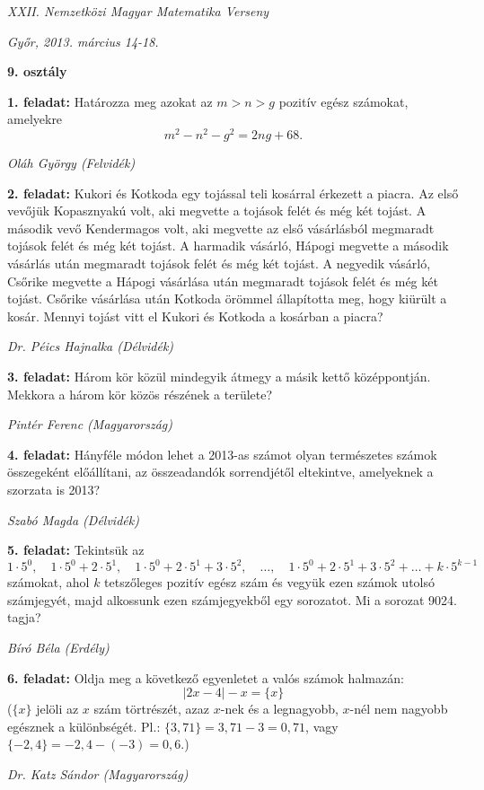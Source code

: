 \documentclass[a4paper,10pt]{article}
\newcommand{\ki}[2]{\hfill {\it #1 (#2)}\medskip}
\begin{document}
\begin{center} \Large {\em XXII. Nemzetközi Magyar Matematika Verseny} \end{center}
\begin{center} \large{\em Győr, 2013. március 14-18.} \end{center}
\smallskip
\begin{center} \large{\bf 9. osztály} \end{center}
\bigskip 

{\bf 1. feladat: } Határozza meg azokat az $m > n > g$ pozitív egész számokat, amelyekre
$$m^2-n^2-g^2=2ng+68.$$

\ki{Oláh György}{Felvidék}\medskip

{\bf 2. feladat: } Kukori és Kotkoda egy tojással teli kosárral érkezett a piacra. Az első vevőjük 
Kopasznyakú volt, aki megvette a tojások felét és még két tojást. A második vevő 
Kendermagos volt, aki megvette az első vásárlásból megmaradt tojások felét és még két 
tojást. A harmadik vásárló, Hápogi megvette a második vásárlás után megmaradt tojások 
felét és még két tojást. A negyedik vásárló, Csőrike megvette a Hápogi vásárlása után 
megmaradt tojások felét és még két tojást. Csőrike vásárlása után Kotkoda örömmel 
állapította meg, hogy kiürült a kosár. Mennyi tojást vitt el Kukori és Kotkoda a kosárban a 
piacra? 


\ki{Dr. Péics Hajnalka}{Délvidék}\medskip

{\bf 3. feladat: } Három kör közül mindegyik átmegy a másik kettő középpontján. Mekkora a három kör 
közös részének a területe? 

\ki{Pintér Ferenc}{Magyarország}\medskip

{\bf 4. feladat: } Hányféle módon lehet a 2013-as számot olyan természetes számok összegeként előállítani, az összeadandók sorrendjétől eltekintve, amelyeknek a szorzata is 2013? 


\ki{Szabó Magda}{Délvidék}\medskip

{\bf 5. feladat: } Tekintsük az 
$$1\cdot 5^0,\quad 1\cdot 5^0+2\cdot 5^1,\quad 1\cdot 5^0+2\cdot 5^1+3\cdot 5^2,\quad\ldots,\quad 1\cdot 5^0+2\cdot 5^1+3\cdot 5^2+\ldots+k\cdot 5^{k-1}$$
számokat, ahol $k$ tetszőleges pozitív egész szám és vegyük ezen számok utolsó számjegyét, 
majd alkossunk ezen számjegyekből egy sorozatot. Mi a sorozat 9024. tagja? 


\ki{Bíró Béla}{Erdély}\medskip

{\bf 6. feladat: } Oldja meg a következő egyenletet a valós számok halmazán:
$$\left|2x-4\right|-x=\{x\}$$
($\{x\}$ jelöli az $x$ szám törtrészét, azaz $x$-nek és a legnagyobb, $x$-nél nem nagyobb
egésznek a különbségét. Pl.: $\{3{,}71\} = 3{,}71-3= 0{,}71$, vagy $\{-2{,}4\}= -2{,}4 - (-3) = 0{,}6$.)


\ki{Dr. Katz Sándor}{Magyarország}\medskip
\end{document}
